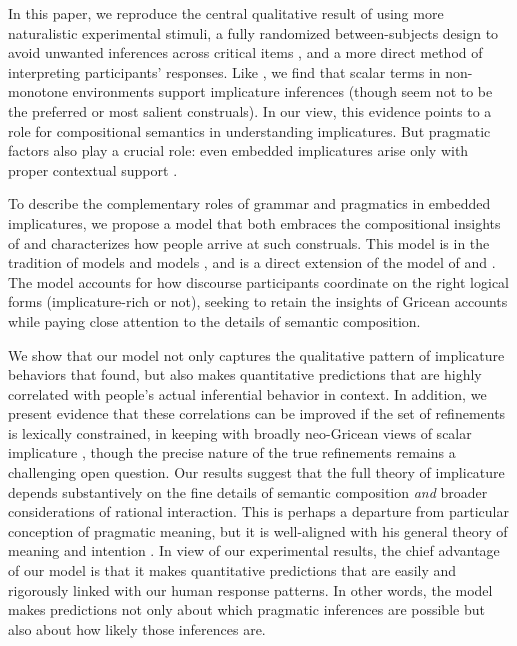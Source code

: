 \documentclass[leqno,12pt]{article}
\begin{document}

In this paper, we reproduce the central qualitative result of
\citet{Chemla:Spector:2011} using more naturalistic experimental
stimuli, a fully randomized between-subjects design to avoid unwanted
inferences across critical items \citep{geurts-vantiel:2013:scalar},
and a more direct method of interpreting participants' responses. Like
\citeauthor{Chemla:Spector:2011}, we find that scalar terms in
non-monotone environments support implicature inferences (though seem
not to be the preferred or most salient construals).  In our view,
this evidence points to a role for compositional semantics in
understanding implicatures. But pragmatic factors also play a crucial
role: even embedded implicatures arise only with proper contextual
support
\citep{Russell06,ChierchiaFoxSpector08,Geurts:2011,Chemla:Spector:2011}.

To describe the complementary roles of grammar and pragmatics in
embedded implicatures, we propose a model that both embraces the
compositional insights of \citeauthor{ChierchiaFoxSpector08} and
characterizes how people arrive at such construals. This model is in
the tradition of  models
\citep{Frank:Goodman:2012,Goodman:Stuhlmuller:2013} and  models \citep{Franke09DISS,Jaeger:2011}, and is a
direct extension of the  model
of \citet{Bergen:Goodman:Levy:2012} and
\citet{Bergen:Levy:Goodman:2014}. The model accounts for how discourse
participants coordinate on the right logical forms (implicature-rich
or not), seeking to retain the insights of Gricean accounts while
paying close attention to the details of semantic composition.


We show that our model not only captures the qualitative pattern of
implicature behaviors that \citeauthor{Chemla:Spector:2011} found, but
also makes quantitative predictions that are highly correlated with
people's actual inferential behavior in context. In addition, we
present evidence that these correlations can be improved if the set of
refinements is lexically constrained, in keeping with broadly
neo-Gricean views of scalar implicature
\citep{Horn72,Gazdar79b,Gazdar79a,SchulzVanRooij06}, though the
precise nature of the true refinements remains a challenging open
question.  Our results suggest that the full theory of implicature
depends substantively on the fine details of semantic composition
\emph{and} broader considerations of rational interaction. This is
perhaps a departure from  particular conception of
pragmatic meaning, but it is well-aligned with his general theory of
meaning and intention \citep{Grice89}.  In view of our experimental
results, the chief advantage of our model is that it makes
quantitative predictions that are easily and rigorously linked with
our human response patterns. In other words, the model makes
predictions not only about which pragmatic inferences are possible but
also about how likely those inferences are.
\end{document}
